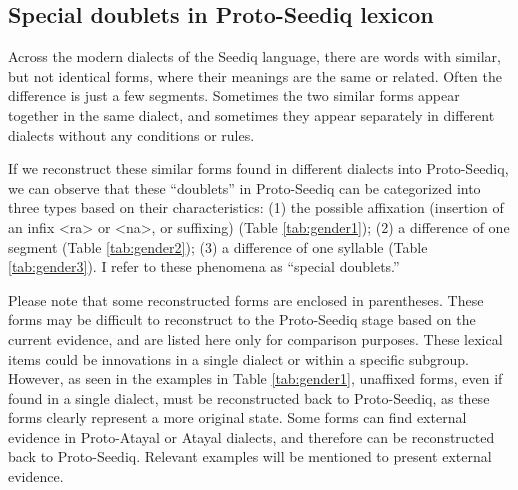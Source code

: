 \documentclass[12pt]{article}
\newcommand{\pataf}{Proto-Atayal\xspace}
\newcommand{\psedf}{Proto-Seediq\xspace}
\begin{document}
\begin{comment}
Portmanteau pronouns, like other clitic pronouns, are enclitics placed after the predicate. They consist of two arguments and are found exclusively in (1) nominal predicate; and (2) non-agent voice (NAV) sentences, where they represent the agent or experiencer. Here are two examples from \textcite[74--75]{Lee2018Trugrammar}.

\begin{exe}

    \ex Nominal predicate sentence
    \gll \textit{anay=misu} \textit{ka} \textit{isu.} \\
    sister's.husband=\textsc{1sg.gen+2sg.nom} \textsc{nom} \textsc{2sg.nom}\\
    \trans `You are my sister's husband. (For me, you are my sister's husband.) '
    \ex NAV sentence
    \gll \textit{wada=misu} \textit{qta-an} \textit{da!} \\
    \textsc{perf}=\textsc{1sg.gen+2sg.nom} see-\textsc{lv} \textsc{ptcl}\\
    \trans `I have already seen you!'
\end{exe}

\end{comment}

\subsection{Special doublets in Proto-Seediq lexicon}

Across the modern dialects of the Seediq language, there are words with similar, but not identical forms, where their meanings are the same or related. Often the difference is just a few segments. Sometimes the two similar forms appear together in the same dialect, and sometimes they appear separately in different dialects without any conditions or rules. 

If we reconstruct these similar forms found in different dialects into \psedf, we can observe that these ``doublets'' in \psedf can be categorized into three types based on their characteristics: (1) the possible affixation (insertion of an infix <ra> or <na>, or suffixing) (Table \ref{tab:gender1}); (2) a difference of one segment (Table \ref{tab:gender2}); (3) a difference of one syllable (Table \ref{tab:gender3}). I refer to these phenomena as ``special doublets.''

Please note that some reconstructed forms are enclosed in parentheses. These forms may be difficult to reconstruct to the \psedf stage based on the current evidence, and are listed here only for comparison purposes. These lexical items could be innovations in a single dialect or within a specific subgroup. However, as seen in the examples in Table \ref{tab:gender1}, unaffixed forms, even if found in a single dialect, must be reconstructed back to \psedf, as these forms clearly represent a more original state. Some forms can find external evidence in \pataf or Atayal dialects, and therefore can be reconstructed back to \psedf. Relevant examples will be mentioned to present external evidence.
\end{document}

